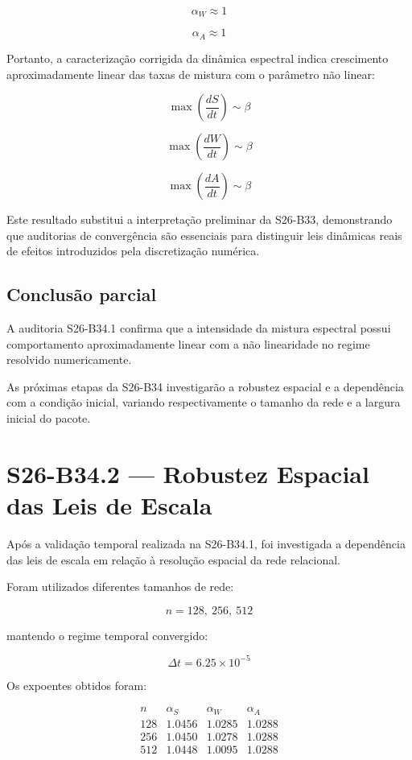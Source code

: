 \documentclass[11pt,a4paper]{article}
\begin{document}
\[
\alpha_W \approx 1
\]

\[
\alpha_A \approx 1
\]


Portanto, a caracterização corrigida da dinâmica espectral indica
crescimento aproximadamente linear das taxas de mistura com o
parâmetro não linear:

\[
\max\left(\frac{dS}{dt}\right)
\sim \beta
\]

\[
\max\left(\frac{dW}{dt}\right)
\sim \beta
\]

\[
\max\left(\frac{dA}{dt}\right)
\sim \beta
\]


Este resultado substitui a interpretação preliminar da S26-B33,
demonstrando que auditorias de convergência são essenciais para
distinguir leis dinâmicas reais de efeitos introduzidos pela
discretização numérica.


\subsection{Conclusão parcial}

A auditoria S26-B34.1 confirma que a intensidade da mistura
espectral possui comportamento aproximadamente linear com a
não linearidade no regime resolvido numericamente.

As próximas etapas da S26-B34 investigarão a robustez espacial
e a dependência com a condição inicial, variando respectivamente
o tamanho da rede e a largura inicial do pacote.

\section{S26-B34.2 — Robustez Espacial das Leis de Escala}

Após a validação temporal realizada na S26-B34.1, foi investigada
a dependência das leis de escala em relação à resolução espacial
da rede relacional.

Foram utilizados diferentes tamanhos de rede:

\[
n = 128,\ 256,\ 512
\]

mantendo o regime temporal convergido:

\[
\Delta t = 6.25\times10^{-5}
\]

Os expoentes obtidos foram:

\[
\begin{array}{c|ccc}
n &
\alpha_S &
\alpha_W &
\alpha_A
\\
\hline

128 &
1.0456 &
1.0285 &
1.0288
\\

256 &
1.0450 &
1.0278 &
1.0288
\\

512 &
1.0448 &
1.0095 &
1.0288
\\

\end{array}
\]
\end{document}
